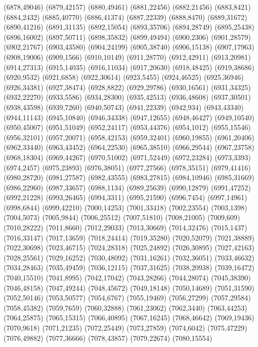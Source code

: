 (6878,49046)
(6879,42157)
(6880,49461)
(6881,22456)
(6882,21456)
(6883,8421)
(6884,2432)
(6885,40770)
(6886,41374)
(6887,22339)
(6888,8470)
(6889,31672)
(6890,41216)
(6891,31135)
(6892,15054)
(6893,35706)
(6894,28749)
(6895,25438)
(6896,16002)
(6897,50711)
(6898,35832)
(6899,49494)
(6900,2306)
(6901,28579)
(6902,21767)
(6903,43580)
(6904,24199)
(6905,38740)
(6906,15138)
(6907,17963)
(6908,19006)
(6909,1566)
(6910,10149)
(6911,28770)
(6912,42911)
(6913,20981)
(6914,27313)
(6915,14035)
(6916,11034)
(6917,20630)
(6918,48425)
(6919,38686)
(6920,9532)
(6921,6858)
(6922,30614)
(6923,5455)
(6924,46525)
(6925,36946)
(6926,34381)
(6927,38474)
(6928,8822)
(6929,29786)
(6930,16561)
(6931,34325)
(6932,22270)
(6933,5586)
(6934,28300)
(6935,42513)
(6936,48608)
(6937,30501)
(6938,43598)
(6939,7260)
(6940,50743)
(6941,22339)
(6942,934)
(6943,43340)
(6944,11143)
(6945,10840)
(6946,34338)
(6947,12655)
(6948,46427)
(6949,10540)
(6950,45007)
(6951,51049)
(6952,24117)
(6953,44376)
(6954,1012)
(6955,15546)
(6956,32101)
(6957,20071)
(6958,42153)
(6959,32401)
(6960,19855)
(6961,20406)
(6962,33440)
(6963,43452)
(6964,22530)
(6965,38510)
(6966,29544)
(6967,23758)
(6968,18304)
(6969,44267)
(6970,51002)
(6971,52449)
(6972,23284)
(6973,3393)
(6974,2457)
(6975,23893)
(6976,38051)
(6977,27566)
(6978,35151)
(6979,41416)
(6980,28720)
(6981,27587)
(6982,43555)
(6983,27815)
(6984,10946)
(6985,31669)
(6986,22960)
(6987,33657)
(6988,1134)
(6989,25639)
(6990,12879)
(6991,47252)
(6992,21228)
(6993,26465)
(6994,3311)
(6995,21590)
(6996,7454)
(6997,14961)
(6998,6844)
(6999,42210)
(7000,14253)
(7001,33418)
(7002,23554)
(7003,1398)
(7004,5073)
(7005,9844)
(7006,25512)
(7007,51810)
(7008,21005)
(7009,609)
(7010,28222)
(7011,8660)
(7012,29033)
(7013,30669)
(7014,32476)
(7015,1437)
(7016,33147)
(7017,13659)
(7018,24414)
(7019,35280)
(7020,52079)
(7021,38889)
(7022,30698)
(7023,46715)
(7024,28318)
(7025,24892)
(7026,30895)
(7027,42163)
(7028,25561)
(7029,16252)
(7030,48092)
(7031,16261)
(7032,36051)
(7033,46632)
(7034,28463)
(7035,49459)
(7036,12115)
(7037,31625)
(7038,20938)
(7039,16472)
(7040,15510)
(7041,8995)
(7042,17042)
(7043,28266)
(7044,28074)
(7045,38390)
(7046,48158)
(7047,49244)
(7048,45672)
(7049,18148)
(7050,14689)
(7051,31590)
(7052,50146)
(7053,50577)
(7054,6767)
(7055,19469)
(7056,27299)
(7057,29584)
(7058,45382)
(7059,7659)
(7060,32888)
(7061,23062)
(7062,3440)
(7063,44253)
(7064,25875)
(7065,15315)
(7066,40895)
(7067,16245)
(7068,46642)
(7069,19436)
(7070,9618)
(7071,21235)
(7072,25449)
(7073,27859)
(7074,6042)
(7075,47229)
(7076,49882)
(7077,36666)
(7078,43857)
(7079,22674)
(7080,15554)
